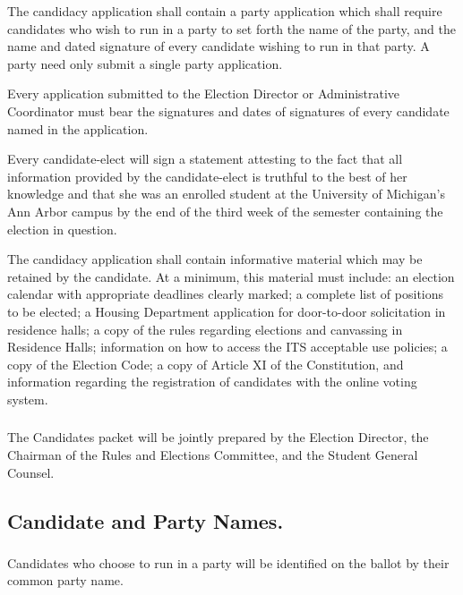 The candidacy application shall contain a party application which shall require candidates who wish to run in a party to set forth the name of the party, and the name and dated signature of every candidate wishing to run in that party.  A party need only submit a single party application.

Every application submitted to the Election Director or Administrative Coordinator must bear the signatures and dates of signatures of every candidate named in the application.

Every candidate-elect will sign a statement attesting to the fact that all information provided by the candidate-elect is truthful to the best of her knowledge and that she was an enrolled student at the University of Michigan's Ann Arbor campus by the end of the third week of the semester containing the election in question.

The candidacy application shall contain informative material which may be retained by the candidate.  At a minimum, this material must include: an election calendar with appropriate deadlines clearly marked; a complete list of positions to be elected; a Housing Department application for door-to-door solicitation in residence halls; a copy of the rules regarding elections and canvassing in Residence Halls; information on how to access the ITS acceptable use policies; a copy of the Election Code; a copy of Article XI of the Constitution, and information regarding the registration of candidates with the online voting system.

\subsubsection{}
The Candidates packet will be jointly prepared by the Election Director, the Chairman of the Rules and Elections Committee, and the Student General Counsel.

\subsection{Candidate and Party Names.}

\subsubsection{}
Candidates who choose to run in a party will be identified on the ballot by their common party name.

